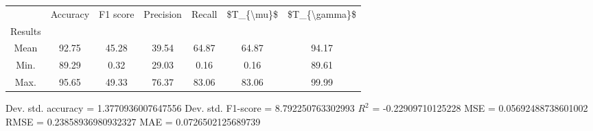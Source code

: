 \begin{tabular}{|c|c|c|c|c|c|c|}
\toprule
{} &  Accuracy &  F1 score &  Precision &  Recall &  \$T\_\{\textbackslash mu\}\$ &  \$T\_\{\textbackslash gamma\}\$ \\
Results &           &           &            &         &            &               \\
\hline
Mean    &     92.75 &     45.28 &      39.54 &   64.87 &      64.87 &         94.17 \\
Min.    &     89.29 &      0.32 &      29.03 &    0.16 &       0.16 &         89.61 \\
Max.    &     95.65 &     49.33 &      76.37 &   83.06 &      83.06 &         99.99 \\
\bottomrule
\end{tabular}

 Dev. std. accuracy = 1.3770936007647556
 Dev. std. F1-score = 8.792250763302993
 $R^2$ = -0.22909710125228
 MSE = 0.05692488738601002
 RMSE = 0.23858936980932327
 MAE = 0.0726502125689739